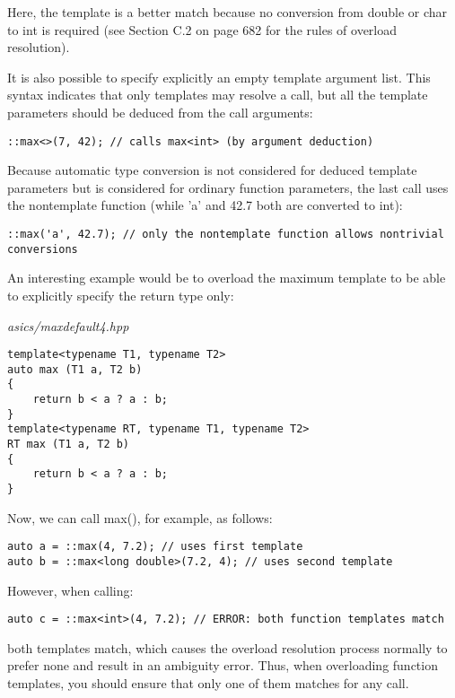 Here, the template is a better match because no conversion from double or char to int is required (see Section C.2 on page 682 for the rules of overload resolution).

It is also possible to specify explicitly an empty template argument list. This syntax indicates that only templates may resolve a call, but all the template parameters should be deduced from the call arguments:

\begin{lstlisting}[style=styleCXX]
::max<>(7, 42); // calls max<int> (by argument deduction)
\end{lstlisting}

Because automatic type conversion is not considered for deduced template parameters but is considered for ordinary function parameters, the last call uses the nontemplate function (while 'a' and 42.7 both are converted to int):

\begin{lstlisting}[style=styleCXX]
::max('a', 42.7); // only the nontemplate function allows nontrivial conversions
\end{lstlisting}

An interesting example would be to overload the maximum template to be able to explicitly specify the return type only:

\noindent
\textit{asics/maxdefault4.hpp}
\begin{lstlisting}[style=styleCXX]
template<typename T1, typename T2>
auto max (T1 a, T2 b)
{
	return b < a ? a : b;
}
template<typename RT, typename T1, typename T2>
RT max (T1 a, T2 b)
{
	return b < a ? a : b;
}
\end{lstlisting}

Now, we can call max(), for example, as follows:

\begin{lstlisting}[style=styleCXX]
auto a = ::max(4, 7.2); // uses first template
auto b = ::max<long double>(7.2, 4); // uses second template
\end{lstlisting}

However, when calling:

\begin{lstlisting}[style=styleCXX]
auto c = ::max<int>(4, 7.2); // ERROR: both function templates match
\end{lstlisting}

both templates match, which causes the overload resolution process normally to prefer none and result in an ambiguity error. Thus, when overloading function templates, you should ensure that only one of them matches for any call.

